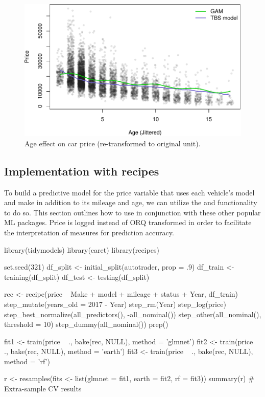 \begin{Schunk}
\begin{figure}

{\centering \includegraphics[width=0.8\linewidth]{figs/gam-tbs-model-1} 

}

\caption[Age effect on car price (re-transformed to original unit)]{Age effect on car price (re-transformed to original unit).}\label{fig:gam-tbs-model}
\end{figure}
\end{Schunk}

\hypertarget{implementation-with-recipes}{%
\subsection{Implementation with
recipes}\label{implementation-with-recipes}}

To build a predictive model for the price variable that uses each
vehicle's model and make in addition to its mileage and age, we can
utilize the  and  functionality to do so. This
section outlines how to use  in conjunction with
these other popular ML packages. Price is logged instead of ORQ
transformed in order to facilitate the interpretation of measures for
prediction accuracy.

\begin{Schunk}
\begin{Sinput}
library(tidymodels)
library(caret)
library(recipes)

set.seed(321)
df_split <- initial_split(autotrader, prop = .9)
df_train <- training(df_split)
df_test <- testing(df_split)

rec <- recipe(price ~ Make + model +  mileage + status + Year, df_train) %
  step_mutate(years_old = 2017 - Year) %
  step_rm(Year) %
  step_log(price) %
  step_best_normalize(all_predictors(), -all_nominal()) %
  step_other(all_nominal(), threshold = 10) %
  step_dummy(all_nominal()) %
  prep()

fit1 <- train(price ~ ., bake(rec, NULL), method = 'glmnet')
fit2 <- train(price ~ ., bake(rec, NULL), method = 'earth')
fit3 <- train(price ~ ., bake(rec, NULL), method = 'rf')

r <- resamples(fits <- list(glmnet = fit1, earth = fit2, rf = fit3))
summary(r) # Extra-sample CV results
\end{Sinput}
\end{Schunk}


